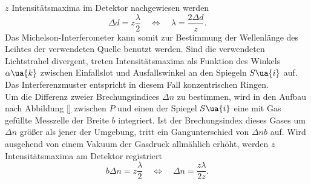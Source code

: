 $z$ Intensitätsmaxima im Detektor nachgewiesen werden
\begin{equation}
  \Delta d = z\frac{\lambda}{2} \quad \Leftrightarrow \quad \lambda = \frac{2 \Delta d}{z}.
  \label{eq: maxima_wellenlänge}
\end{equation}
Das Michelson-Interferometer kann somit zur Bestimmung der Wellenlänge des Lcihtes der verwendeten Quelle benutzt werden. Sind die verwendeten
Lichtstrahel divergent, treten Intensitätsmaxima als Funktion des Winkels $\alpha\ua{k}$ zwischen Einfallslot und Ausfallswinkel an den Spiegeln $S\ua{i}$
auf. Das Interferenzmuster entspricht in diesem Fall konzentrischen Ringen.\\
Um die Differenz zweier Brechungsindices $\Delta n$ zu bestimmen, wird in den Aufbau nach Abbildung \ref{} zwischen $P$ und einen der Spiegel $S\ua{i}$ eine
mit Gas gefüllte Messzelle der Breite $b$ integriert. Ist der Brechungsindex dieses Gases um $\Delta n$ größer als jener der Umgebung,
tritt ein Gangunterschied von $\Delta n b$ auf. Wird ausgehend von einem Vakuum der Gasdruck allmählich erhöht, werden $z$ Intensitätsmaxima am Detektor
registriert
\begin{equation}
  b \Delta n = z\frac{\lambda}{2} \quad \Leftrightarrow \quad \Delta n = \frac{z \lambda}{2z}.
  \label{eq: maxima_brechungsindex}
\end{equation}
